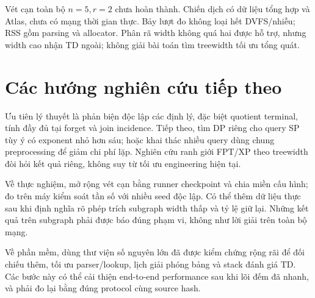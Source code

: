 Vét cạn toàn bộ $n=5,r=2$ chưa hoàn thành. Chiến dịch có dữ liệu tổng hợp và Atlas, chưa có mạng thời gian thực. Bảy lượt đo không loại hết DVFS/nhiễu; RSS gồm parsing và allocator. Phân rã width không quá hai được hỗ trợ, nhưng width cao nhận TD ngoài; không giải bài toán tìm treewidth tối ưu tổng quát.

\section{Các hướng nghiên cứu tiếp theo}

Ưu tiên lý thuyết là phản biện độc lập các định lý, đặc biệt quotient terminal, tính đầy đủ tại forget và join incidence. Tiếp theo, tìm DP riêng cho query SP tùy ý có exponent nhỏ hơn sáu; hoặc khai thác nhiều query dùng chung preprocessing để giảm chi phí lặp. Nghiên cứu ranh giới FPT/XP theo treewidth đòi hỏi kết quả riêng, không suy từ tối ưu engineering hiện tại.

Về thực nghiệm, mở rộng vét cạn bằng runner checkpoint và chia miền cấu hình; đo trên máy kiểm soát tần số với nhiều seed độc lập. Có thể thêm dữ liệu thực sau khi định nghĩa rõ phép trích subgraph width thấp và tỷ lệ giữ lại. Những kết quả trên subgraph phải được báo đúng phạm vi, không như lời giải trên toàn bộ mạng.

Về phần mềm, dùng thư viện số nguyên lớn đã được kiểm chứng rộng rãi để đối chiếu thêm, tối ưu parser/lookup, lịch giải phóng bảng và stack đánh giá TD. Các bước này có thể cải thiện end-to-end performance sau khi lõi đếm đã nhanh, và phải đo lại bằng đúng protocol cùng source hash.
